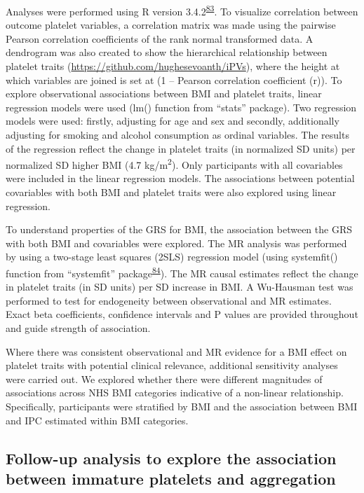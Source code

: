 \documentclass[11pt,twoside]{bristolthesis}
\begin{document}
Analyses were performed using R version 3.4.2\textsuperscript{\protect\hyperlink{ref-Team2019a}{83}}. To visualize correlation between outcome platelet variables, a correlation matrix was made using the pairwise Pearson correlation coefficients of the rank normal transformed data. A dendrogram was also created to show the hierarchical relationship between platelet traits (\url{https://github.com/hughesevoanth/iPVs}), where the height at which variables are joined is set at (1 -- Pearson correlation coefficient (r)). To explore observational associations between BMI and platelet traits, linear regression models were used (lm() function from ``stats'' package). Two regression models were used: firstly, adjusting for age and sex and secondly, additionally adjusting for smoking and alcohol consumption as ordinal variables. The results of the regression reflect the change in platelet traits (in normalized SD units) per normalized SD higher BMI (4.7 kg/m\textsuperscript{2}). Only participants with all covariables were included in the linear regression models. The associations between potential covariables with both BMI and platelet traits were also explored using linear regression.

To understand properties of the GRS for BMI, the association between the GRS with both BMI and covariables were explored. The MR analysis was performed by using a two-stage least squares (2SLS) regression model (using systemfit() function from ``systemfit'' package\textsuperscript{\protect\hyperlink{ref-Henningsen2007}{84}}). The MR causal estimates reflect the change in platelet traits (in SD units) per SD increase in BMI. A Wu-Hausman test was performed to test for endogeneity between observational and MR estimates. Exact beta coefficients, confidence intervals and P values are provided throughout and guide strength of association.

Where there was consistent observational and MR evidence for a BMI effect on platelet traits with potential clinical relevance, additional sensitivity analyses were carried out. We explored whether there were different magnitudes of associations across NHS BMI categories indicative of a non-linear relationship. Specifically, participants were stratified by BMI and the association between BMI and IPC estimated within BMI categories.

\hypertarget{follow-up-analysis-to-explore-the-association-between-immature-platelets-and-aggregation}{%
\subsection{Follow-up analysis to explore the association between immature platelets and aggregation}\label{follow-up-analysis-to-explore-the-association-between-immature-platelets-and-aggregation}}
\end{document}
